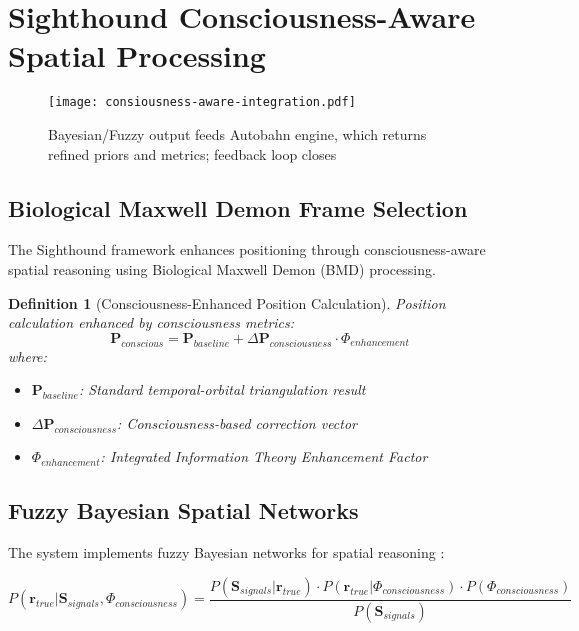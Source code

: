 \documentclass[12pt,a4paper]{article}
\newtheorem{definition}[theorem]{Definition}
\begin{document}
\section{Sighthound Consciousness-Aware Spatial Processing}

\begin{figure}[H]
\centering
\texttt{[image: consiousness-aware-integration.pdf]}
\caption{Bayesian/Fuzzy output feeds Autobahn engine, which returns refined priors and metrics; feedback loop closes}
\label{fig:consiousness-aware-integration}
\end{figure}

\subsection{Biological Maxwell Demon Frame Selection}

The Sighthound framework enhances positioning through consciousness-aware spatial reasoning using Biological Maxwell Demon (BMD) processing.

\begin{definition}[Consciousness-Enhanced Position Calculation]
Position calculation enhanced by consciousness metrics:
\begin{equation}
\mathbf{P}_{conscious} = \mathbf{P}_{baseline} + \Delta\mathbf{P}_{consciousness} \cdot \Phi_{enhancement}
\end{equation}
where:
\begin{itemize}
\item $\mathbf{P}_{baseline}$: Standard temporal-orbital triangulation result
\item $\Delta\mathbf{P}_{consciousness}$: Consciousness-based correction vector
\item $\Phi_{enhancement}$: Integrated Information Theory Enhancement Factor
\end{itemize}
\end{definition}

\subsection{Fuzzy Bayesian Spatial Networks}

The system implements fuzzy Bayesian networks for spatial reasoning \cite{bishop2006,russell2020}:

\begin{equation}
P(\mathbf{r}_{true} | \mathbf{S}_{signals}, \Phi_{consciousness}) = \frac{P(\mathbf{S}_{signals} | \mathbf{r}_{true}) \cdot P(\mathbf{r}_{true} | \Phi_{consciousness}) \cdot P(\Phi_{consciousness})}{P(\mathbf{S}_{signals})}
\end{equation}
\end{document}
